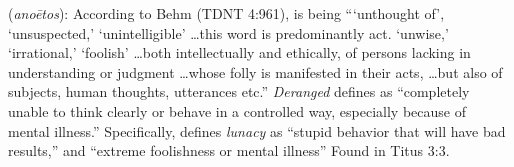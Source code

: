\item[Lunacy,]

(\textit{anoētos}):
According to Behm (TDNT 4:961), is being ```unthought of', `unsuspected,' `unintelligible' \ldots this word is predominantly act. `unwise,' `irrational,' `foolish' \ldots both intellectually and ethically, of persons lacking in understanding or judgment \ldots whose folly is manifested in their acts, \ldots but also of subjects, human thoughts, utterances etc.'' \emph{Deranged} defines as ``completely unable to think clearly or behave in a controlled way, especially because of mental illness.'' Specifically, defines \emph{lunacy} as ``stupid behavior that will have bad results,'' and ``extreme foolishness or mental illness''
Found in Titus 3:3.
